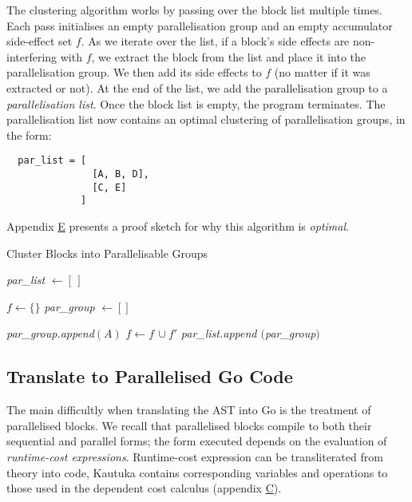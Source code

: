 The clustering algorithm works by passing over the block list multiple times. Each pass initialises an empty parallelisation group and an empty accumulator side-effect set \( f \). As we iterate over the list, if a block's side effects are non-interfering with \( f \), we extract the block from the list and place it into the parallelisation group. We then add its side effects to \( f \) (no matter if it was extracted or not). At the end of the list, we add the parallelisation group to a \textit{parallelisation list}. Once the block list is empty, the program terminates. The parallelisation list now contains an optimal clustering of parallelisation groups, in the form:

\begin{verbatim}
  par_list = [
               [A, B, D],
               [C, E]
             ]
\end{verbatim}

Appendix \hyperref[sec:E]{E} presents a proof sketch for why this algorithm is \textit{optimal}.

\begin{algorithm}[hbt!]
  \caption{Cluster Blocks into Parallelisable Groups}\label{alg:one}

  \BlankLine

  \textit{par\_list} \( \gets [ \, ] \)\;

  \BlankLine

   {

    \BlankLine

    \( f \gets \{ \} \)\;
    \textit{par\_group} \( \gets [] \)\;

    \BlankLine

     {
       {
        \textit{par\_group.append}\( (A) \)\;
      }
      \( \textit{f} \gets \textit{f} \, \cup f' \)\;
    }
    \textit{par\_list.append \( \! ( \)par\_group\( ) \)}\;
  }
\end{algorithm}


\subsection{Translate to Parallelised Go Code}

\label{sec:3.6.2}

The main difficultly when translating the AST into Go is the treatment of parallelised blocks. We recall that parallelised blocks compile to both their sequential and parallel forms; the form executed depends on the evaluation of \textit{runtime-cost expressions}. Runtime-cost expression can be transliterated from theory into code, Kautuka contains corresponding variables and operations to those used in the dependent cost calculus (appendix \hyperref[sec:C]{C}).


